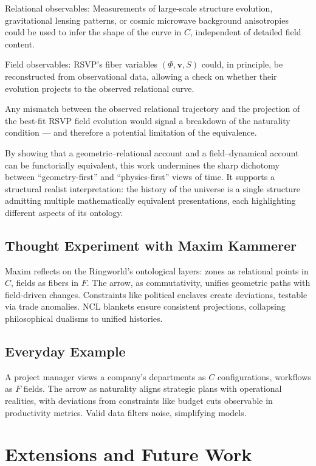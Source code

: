 \documentclass[11pt]{article}
\theoremstyle{plain}
\theoremstyle{definition}
\begin{document}
Relational observables: Measurements of large-scale structure evolution, gravitational lensing patterns, or cosmic microwave background anisotropies could be used to infer the shape of the curve in $C$, independent of detailed field content.

Field observables: RSVP’s fiber variables $(\Phi, \mathbf{v}, S)$ could, in principle, be reconstructed from observational data, allowing a check on whether their evolution projects to the observed relational curve.

Any mismatch between the observed relational trajectory and the projection of the best-fit RSVP field evolution would signal a breakdown of the naturality condition — and therefore a potential limitation of the equivalence.

By showing that a geometric–relational account and a field–dynamical account can be functorially equivalent, this work undermines the sharp dichotomy between “geometry-first” and “physics-first” views of time. It supports a structural realist interpretation: the history of the universe is a single structure admitting multiple mathematically equivalent presentations, each highlighting different aspects of its ontology.

\subsection{Thought Experiment with Maxim Kammerer}
Maxim reflects on the Ringworld’s ontological layers: zones as relational points in $C$, fields as fibers in $F$. The arrow, as commutativity, unifies geometric paths with field-driven changes. Constraints like political enclaves create deviations, testable via trade anomalies. NCL blankets ensure consistent projections, collapsing philosophical dualisms to unified histories.

\subsection{Everyday Example}
A project manager views a company's departments as $C$ configurations, workflows as $F$ fields. The arrow as naturality aligns strategic plans with operational realities, with deviations from constraints like budget cuts observable in productivity metrics. Valid data filters noise, simplifying models.

\section{Extensions and Future Work}
\end{document}
